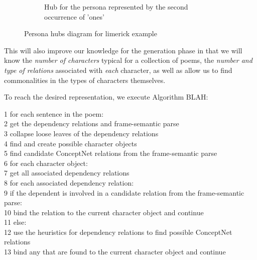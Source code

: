 \begin{figure*}[t!]
\begin{subfigure}[t]{0.45\textwidth}
            \caption{Hub for the persona represented by the second occurrence of 'ones'}
        \end{subfigure}
    \caption{Persona hubs diagram for limerick example}
    \label{fig:limerick-hubs}
\end{figure*}

This will also improve our knowledge for the generation phase in that we will know the \textit{number of characters} typical for a collection of poems, the \textit{number and type of relations} associated with \textit{each} character, as well as allow us to find commonalities in the types of characters themselves.

To reach the desired representation, we execute Algorithm BLAH:

1 for each sentence in the poem:\\
2   get the dependency relations and frame-semantic parse\\
3	collapse loose leaves of the dependency relations\\
4	find and create possible character objects\\
5	find candidate ConceptNet relations from the frame-semantic parse\\
6	for each character object:\\
7		get all associated dependency relations\\
8		for each associated dependency relation:\\
9			if the dependent is involved in a candidate relation from the frame-semantic parse:\\
10				bind the relation to the current character object and continue\\
11			else:\\
12				use the heuristics for dependency relations to find possible ConceptNet relations\\
13				bind any that are found to the current character object and continue\\
				
